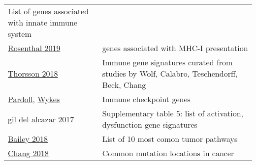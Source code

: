 \documentclass[
]{book}
\begin{document}
\begin{longtable}[]{@{}ll@{}}
\begin{minipage}[t]{0.73\columnwidth}
List of genes associated with innate immune system\strut
\end{minipage}\tabularnewline
\begin{minipage}[t]{0.21\columnwidth}\raggedright
\href{https://dx.doi.org/10.1038/s41586-019-1032-7}{Rosenthal 2019}\strut
\end{minipage} & \begin{minipage}[t]{0.73\columnwidth}\raggedright
genes associated with MHC-I presentation\strut
\end{minipage}\tabularnewline
\begin{minipage}[t]{0.21\columnwidth}\raggedright
\href{http://dx.doi.org/10.1016/j.immuni.2018.03.023}{Thorsson 2018}\strut
\end{minipage} & \begin{minipage}[t]{0.73\columnwidth}\raggedright
Immune gene signatures curated from studies by Wolf, Calabro, Teschendorff, Beck, Chang\strut
\end{minipage}\tabularnewline
\begin{minipage}[t]{0.21\columnwidth}\raggedright
\href{https://www.ncbi.nlm.nih.gov/pubmed/22437870}{Pardoll}, \href{https://www.ncbi.nlm.nih.gov/pubmed/28990586}{Wykes}\strut
\end{minipage} & \begin{minipage}[t]{0.73\columnwidth}\raggedright
Immune checkpoint genes\strut
\end{minipage}\tabularnewline
\begin{minipage}[t]{0.21\columnwidth}\raggedright
\href{https://cancerdiscovery.aacrjournals.org/content/early/2017/09/19/2159-8290.CD-17-0222}{gil del alcazar 2017}\strut
\end{minipage} & \begin{minipage}[t]{0.73\columnwidth}\raggedright
Supplementary table 5: list of activation, dysfunction gene signatures\strut
\end{minipage}\tabularnewline
\begin{minipage}[t]{0.21\columnwidth}\raggedright
\href{https://www.ncbi.nlm.nih.gov/pmc/articles/PMC6029450/}{Bailey 2018}\strut
\end{minipage} & \begin{minipage}[t]{0.73\columnwidth}\raggedright
List of 10 most comon tumor pathways\strut
\end{minipage}\tabularnewline
\begin{minipage}[t]{0.21\columnwidth}\raggedright
\href{https://pubmed.ncbi.nlm.nih.gov/29247016/}{Chang 2018}\strut
\end{minipage} & \begin{minipage}[t]{0.73\columnwidth}\raggedright
Common mutation locations in cancer\strut
\end{minipage}\tabularnewline
\bottomrule
\end{longtable}
\end{document}
